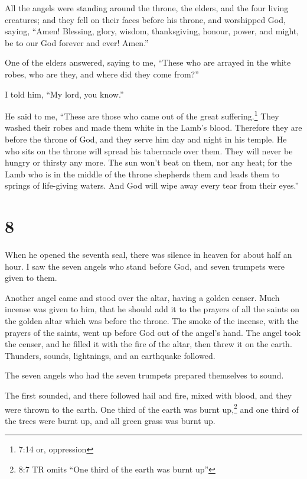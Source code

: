  All the angels were standing around the throne, the
elders, and the four living creatures; and they fell on their faces
before his throne, and worshipped God,  saying, ``Amen!
Blessing, glory, wisdom, thanksgiving, honour, power, and might, be to
our God forever and ever! Amen.''

 One of the elders answered, saying to me, ``These who are
arrayed in the white robes, who are they, and where did they come
from?''

 I told him, ``My lord, you know.''

He said to me, ``These are those who came out of the great
suffering.\footnote{7:14 or, oppression} They washed their robes and
made them white in the Lamb's blood.  Therefore they are
before the throne of God, and they serve him day and night in his
temple. He who sits on the throne will spread his tabernacle over them.
 They will never be hungry or thirsty any more. The sun
won't beat on them, nor any heat;  for the Lamb who is in
the middle of the throne shepherds them and leads them to springs of
life-giving waters. And God will wipe away every tear from their eyes.''

\hypertarget{section-7}{%
\section{8}\label{section-7}}

 When he opened the seventh seal, there was silence in
heaven for about half an hour.  I saw the seven angels who
stand before God, and seven trumpets were given to them.

 Another angel came and stood over the altar, having a
golden censer. Much incense was given to him, that he should add it to
the prayers of all the saints on the golden altar which was before the
throne.  The smoke of the incense, with the prayers of the
saints, went up before God out of the angel's hand.  The
angel took the censer, and he filled it with the fire of the altar, then
threw it on the earth. Thunders, sounds, lightnings, and an earthquake
followed.

 The seven angels who had the seven trumpets prepared
themselves to sound.

 The first sounded, and there followed hail and fire, mixed
with blood, and they were thrown to the earth. One third of the earth
was burnt up,\footnote{8:7 TR omits ``One third of the earth was burnt
  up''} and one third of the trees were burnt up, and all green grass
was burnt up.

